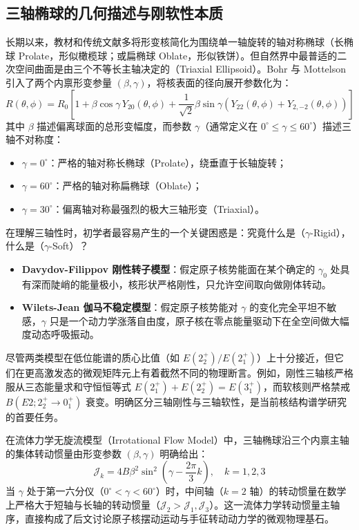 \subsection{三轴椭球的几何描述与刚软性本质}

长期以来，教材和传统文献多将形变核简化为围绕单一轴旋转的轴对称椭球（长椭球 Prolate，形似橄榄球；或扁椭球 Oblate，形似铁饼）。但自然界中最普适的二次空间曲面是由三个不等长主轴决定的（Triaxial Ellipsoid）。Bohr 与 Mottelson 引入了两个内禀形变参量 $(\beta, \gamma)$，将核表面的径向展开参数化为：
\begin{equation}
    R(\theta, \phi) = R_0 \left[ 1 + \beta \cos\gamma \, Y_{20}(\theta, \phi) + \frac{1}{\sqrt{2}} \beta \sin\gamma \left( Y_{22}(\theta, \phi) + Y_{2,-2}(\theta, \phi) \right) \right]
    \label{eq:bohr_surface}
\end{equation}
其中 $\beta$ 描述偏离球面的总形变幅度，而参数 $\gamma$（通常定义在 $0^\circ \le \gamma \le 60^\circ$）描述三轴不对称度：
\begin{itemize}
    \item $\gamma = 0^\circ$：严格的轴对称长椭球（Prolate），绕垂直于长轴旋转；
    \item $\gamma = 60^\circ$：严格的轴对称扁椭球（Oblate）；
    \item $\gamma = 30^\circ$：偏离轴对称最强烈的极大三轴形变（Triaxial）。
\end{itemize}

在理解三轴性时，初学者最容易产生的一个关键困惑是：究竟什么是（$\gamma$-Rigid），什么是（$\gamma$-Soft）？
\begin{itemize}
    \item \textbf{Davydov-Filippov 刚性转子模型}：假定原子核势能面在某个确定的 $\gamma_0$ 处具有深而陡峭的能量极小，核形状严格刚性，只允许空间取向做刚体转动。
    \item \textbf{Wilets-Jean 伽马不稳定模型}：假定原子核势能对 $\gamma$ 的变化完全平坦不敏感，$\gamma$ 只是一个动力学涨落自由度，原子核在零点能量驱动下在全空间做大幅度动态呼吸振动。
\end{itemize}
尽管两类模型在低位能谱的质心比值（如 $E(2_2^+)/E(2_1^+)$）上十分接近，但它们在更高激发态的微观矩阵元上有着截然不同的物理断言。例如，刚性三轴核严格服从三态能量求和守恒恒等式 $E(2_1^+) + E(2_2^+) = E(3_1^+)$，而软核则严格禁戒 $B(E2; 2_2^+ \to 0_1^+)$ 衰变。明确区分三轴刚性与三轴软性，是当前核结构谱学研究的首要任务。

在流体力学无旋流模型（Irrotational Flow Model）中，三轴椭球沿三个内禀主轴的集体转动惯量由形变参数 $(\beta, \gamma)$ 明确给出：
\begin{equation}
    \mathcal{J}_k = 4 B \beta^2 \sin^2\left(\gamma - \frac{2\pi}{3} k\right), \quad k = 1, 2, 3
    \label{eq:irrotational_moi}
\end{equation}
当 $\gamma$ 处于第一六分仪（$0^\circ < \gamma < 60^\circ$）时，中间轴（$k=2$ 轴）的转动惯量在数学上严格大于短轴与长轴的转动惯量（$\mathcal{J}_2 > \mathcal{J}_1, \mathcal{J}_3$）。这一流体力学转动惯量主轴序，直接构成了后文讨论原子核摆动运动与手征转动动力学的微观物理基石。

